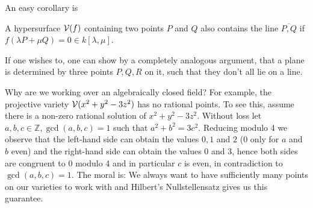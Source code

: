 An easy corollary is
\begin{lemma} \label{lemmaLineOnSurface}
A hypersurface $\operatorname{\mathcal V}(f)$ containing two points $P$ and $Q$ also contains the line $\overline{P,Q}$ if $f(\lambda P +\mu Q) = 0 \in k[\lambda,\mu]$.
\end{lemma}

If one wishes to, one can show by a completely analogous argument, that a plane is determined by three points $P,Q,R$ on it, such that they don't all lie on a line.

\begin{remark}
Why are we working over an algebraically closed field?
For example, the projective variety $\operatorname{\mathcal V}(x^2 + y^2 - 3z^2)$ has no rational points.
To see this, assume there is a non-zero rational solution of $x^2 + y^2 -3z^2$.
Without loss let $a,b,c\in \mathbb Z, \gcd(a,b,c) = 1$ such that $a^2 + b^2 = 3c^2$.
Reducing modulo 4 we observe that the left-hand side can obtain the values $0,1$ and $2$ ($0$ only for $a$ and $b$ even) and the right-hand side can obtain the values $0$ and $3$, hence both sides are congruent to $0$ modulo 4 and in particular $c$ is even, in contradiction to $\gcd(a,b,c) =1$.
The moral is: We always want to have sufficiently many points on our varieties to work with and Hilbert's Nullstellensatz gives us this guarantee.
\end{remark}
